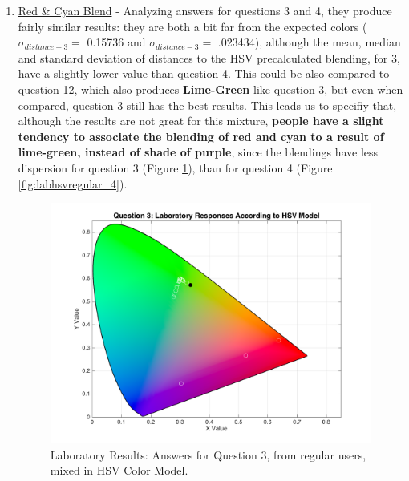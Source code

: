 \begin{enumerate}
  \item \ul{Red \& Cyan Blend} - Analyzing answers for questions 3 and 4, they produce fairly similar results: they are both a bit far from the expected colors ($\sigma_{distance-3} = $ 0.15736 and $\sigma_{distance-3} = $ .023434), although the mean, median and standard
  deviation of distances to the HSV precalculated blending, for 3, have a slightly lower value than question 4. This could be also compared to question 12, which also produces \textbf{Lime-Green} like question 3, but even when compared, question 3 still has the best results.
  This leads us to specifiy that, although the results are not great for this mixture, \textbf{people have a slight tendency to associate the blending of red and cyan to a result of lime-green, instead of shade of purple}, since the blendings have less dispersion for question 3
  (Figure \ref{fig:labhsvregular_3}), than for question 4 (Figure \ref{fig:labhsvregular_4}).
  \begin{figure}[htbp]
    \centering
    \begin{minipage}{0.48\textwidth}
      \centering
      \includegraphics[width=\textwidth]{images/3_lab_HSVresponses.png}
      \caption[Laboratory Results: Answers for Question 3, from regular users, mixed in HSV Color Model.]{Laboratory Results: Answers for Question 3, from regular users, mixed in HSV Color Model.}
      \label{fig:labhsvregular_3}
    \end{minipage}\hfill
    \begin{minipage}{0.48\textwidth}
      \centering

\end{minipage}
\end{figure}
\end{enumerate}
